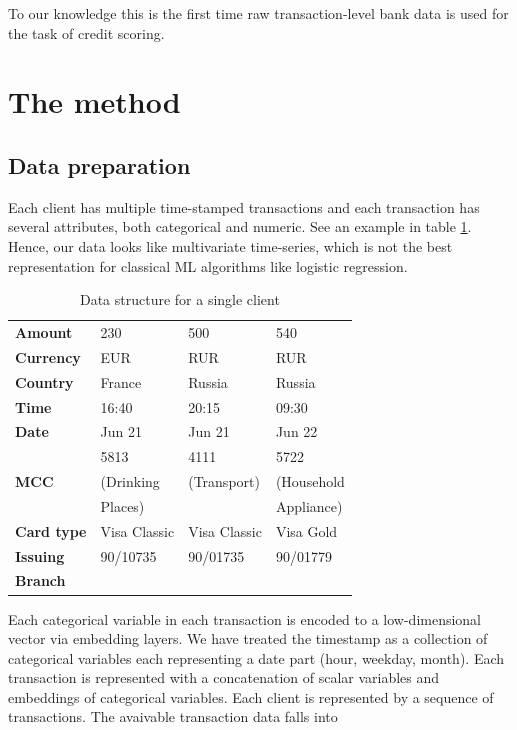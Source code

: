 \documentclass{sigkddExp}
\begin{document}
To our knowledge this is the first time raw transaction-level bank data is used for the task of credit scoring. 

\section{The method}
\subsection{Data preparation}


Each client has multiple time-stamped transactions and each transaction has several attributes, both categorical and numeric. See an example in table \ref{tab1}. Hence, our data looks like multivariate time-series, which is not the best representation for classical ML algorithms like logistic regression.

\begin{table}
\caption{Data structure for a single client}
\begin{tabular}{ | l |  l l l | }
\hline
\textbf{Amount} & 230 & 500 & 540 \\
\textbf{Currency} & EUR & RUR & RUR \\
\textbf{Country} & France & Russia & Russia \\
\textbf{Time} & 16:40 & 20:15 & 09:30 \\
\textbf{Date} & Jun 21 & Jun 21 & Jun 22 \\
 & 5813 & 4111 & 5722 \\
\textbf{MCC} & (Drinking & (Transport) & (Household \\
 & Places) &  & Appliance) \\
\textbf{Card type} & Visa Classic & Visa Classic & Visa Gold \\
\textbf{Issuing} & 90/10735 & 90/01735 & 90/01779 \\
\textbf{Branch} &&& \\
\hline
\end{tabular}
\label{tab1}
\end{table}

Each categorical variable in each transaction is encoded to a low-dimensional vector via embedding layers. We have treated the timestamp as a collection of categorical variables each representing a date part (hour, weekday, month). Each transaction is represented with a concatenation of scalar variables and embeddings of categorical variables. Each client is represented by a sequence of transactions.
The avaivable transaction data falls into 
\end{document}
